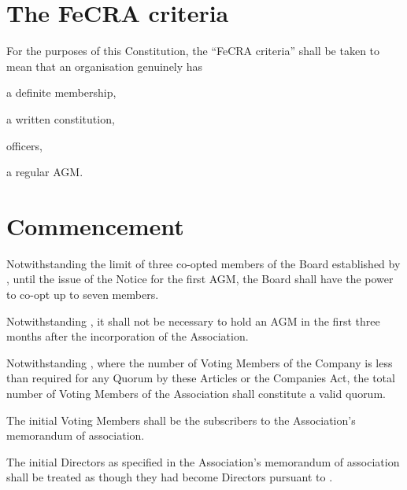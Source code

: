 \documentclass[10pt]{mk-articles-of-association}
\newcommand{\EC}[0]{Board}
\newcommand{\Exec}[0]{\EC{} }
\begin{document}

\section{The FeCRA criteria}
\label{fecracrit}

For the purposes of this Constitution, the ``FeCRA criteria'' shall be taken
to mean that an organisation genuinely has

\begin{constenum}

\item a definite membership,

\item a written constitution,

\item officers, \ITand

\item a regular AGM.

\end{constenum}

\section{Commencement}

\begin{constenum}
  \item Notwithstanding the limit of three co-opted members of the
    \Exec established by , until the issue of
    the Notice for the first AGM, the \Exec shall have the power to
    co-opt up to seven members.

  \item Notwithstanding , it shall not
    be necessary to hold an AGM in the first three months after the
    incorporation of the Association.

  \item Notwithstanding , where the number of
    Voting Members of the Company is less than required for any Quorum
    by these Articles or the Companies Act, the total number of Voting
    Members of the Association shall constitute a valid quorum.

  \item The initial Voting Members shall
    be the subscribers to the Association’s memorandum of association.

  \item The initial Directors as specified in the Association’s
    memorandum of association shall be treated as though they had
    become Directors pursuant to .

\end{constenum}
\end{document}
